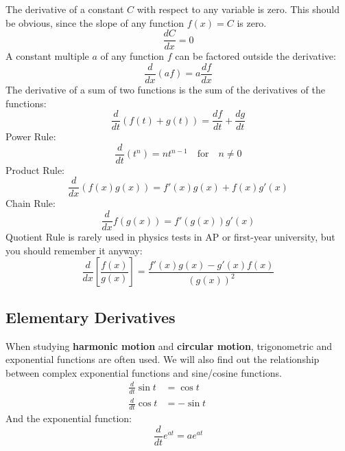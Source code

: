 \documentclass{../../../oss-handout}
\begin{document}
The derivative of a constant $C$ with respect to any variable is zero. This
should be obvious, since the slope of any function $f(x)=C$ is zero.
\begin{equation*}
  \frac{dC}{dx}=0
\end{equation*}
A constant multiple $a$ of any function $f$ can be factored outside the
derivative:
\begin{equation*}
  \frac{d}{dx}(af)=a\frac{df}{dx}
\end{equation*}
The derivative of a sum of two functions is the sum of the derivatives of the
functions:
\begin{equation*}
  \frac{d}{dt}\left(f(t)+g(t)\right) = \frac{df}{dt}+\frac{dg}{dt}
\end{equation*}
Power Rule:
\begin{equation*}
  \frac{d}{dt}\left(t^n\right) = nt^{n-1}\quad\text{for}\quad n\neq 0
\end{equation*}
Product Rule:
\begin{equation*}
  \frac{d}{dx}\left(f(x)g(x)\right)=f'(x)g(x)+f(x)g'(x)
\end{equation*}
Chain Rule:
\begin{equation*}
  \frac{d}{dx}f\left(g(x)\right)=f'(g(x))g'(x)
\end{equation*}
Quotient Rule is rarely used in physics tests in AP or first-year university,
but you should remember it anyway:
\begin{equation*}
  \frac{d}{dx}\left[\frac{f(x)}{g(x)}\right]=
  \frac{f'(x)g(x)-g'(x)f(x)}{\left(g(x)\right)^2}
\end{equation*}



\subsection{Elementary Derivatives}
When studying \textbf{harmonic motion} and \textbf{circular motion},
trigonometric and exponential functions are often used. We will also find out
the relationship between complex exponential functions and sine/cosine
functions. %
\begin{align*}
    \frac{d}{dt}\sin t &= \cos t \quad\quad\quad\\
    \frac{d}{dt}\cos t &= -\sin t
\end{align*}
And the exponential function:
\begin{equation*}
  \frac{d}{dt}e^{at} = ae^{at}
\end{equation*}
\end{document}
